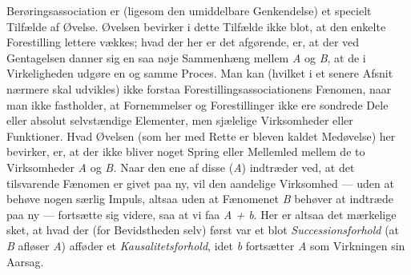 \documentclass[12pt,a4paper,openany]{book}
\newcommand{\opage}[1]{\marginnote{\footnotesize\textit{[#1]}}}
\begin{document}
\setcounter{footnote}{0}%
\opage{37}Berøringsassociation er (ligesom den umiddelbare Genkendelse) et
specielt Tilfælde af Øvelse. Øvelsen bevirker i dette Tilfælde ikke blot, at
den enkelte Forestilling lettere vækkes; hvad der her er det afgørende, er, at
der ved Gentagelsen danner sig en saa nøje Sammenhæng mellem \textit{A}
og\textit{ B}, at de i Virkeligheden udgøre en og samme Proces. Man kan
(hvilket i et senere Afsnit nærmere skal udvikles) ikke forstaa
Forestillingsassociationens Fænomen, naar man ikke fastholder, at Fornemmelser
og Forestillinger ikke ere sondrede Dele eller absolut selvstændige Elementer,
men sjælelige Virksomheder eller Funktioner. Hvad Øvelsen (som her med Rette er
bleven kaldet Medøvelse) her bevirker, er, at der ikke bliver noget Spring
eller Mellemled mellem de to Virksomheder \textit{A} og \textit{B.} Naar den
ene af disse (\textit{A}) indtræder ved, at det tilsvarende Fænomen er givet
paa ny, vil den aandelige Virksomhed --- uden at behøve nogen særlig Impuls,
altsaa uden at Fænomenet \textit{B} behøver at indtræde paa ny --- fortsætte
sig videre, saa at vi faa \textit{A + b}. Her er altsaa det mærkelige sket, at
hvad der (for Bevidstheden selv) først var et blot \emph{Successionsforhold}
(at \textit{B} afløser \textit{A}) afføder et \emph{Kausalitetsforhold}, idet
\textit{b} fortsætter \textit{A} som Virkningen sin Aarsag.
\end{document}
